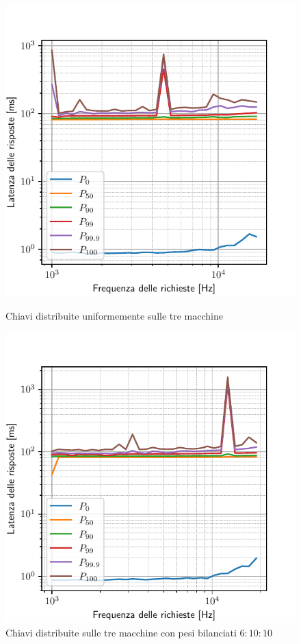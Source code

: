 \begin{figure}[htbp]
    \centering
    \begin{minipage}[t]{0.48\textwidth}
        \centering
        \includegraphics[width=\textwidth]{03-risultati/bench-set-all}
        \caption*{Chiavi distribuite uniformemente sulle tre macchine}
    \end{minipage}
    \hfill
    \begin{minipage}[t]{0.48\textwidth}
        \centering
        \includegraphics[width=\textwidth]{03-risultati/bench-set-all-balance}
        \caption*{Chiavi distribuite sulle tre macchine con pesi bilanciati $6{:}10{:}10$}
    \end{minipage}


\end{figure}
